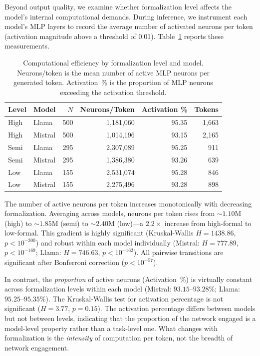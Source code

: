 \documentclass[runningheads]{llncs}
\begin{document}
Beyond output quality, we examine whether formalization level affects the model's internal computational demands. During inference, we instrument each model's MLP layers to record the average number of activated neurons per token (activation magnitude above a threshold of 0.01). Table~\ref{tab:efficiency} reports these measurements.

\begin{table}[h]
\centering
\caption{Computational efficiency by formalization level and model. Neurons/token is the mean number of active MLP neurons per generated token. Activation~\% is the proportion of MLP neurons exceeding the activation threshold.}
\label{tab:efficiency}
\begin{tabular}{llrrrr}
\toprule
Level & Model & $N$ & Neurons/Token & Activation \% & Tokens \\
\midrule
High  & Llama   & 500 & 1{,}181{,}060 & 95.35 & 1{,}663 \\
High  & Mistral & 500 & 1{,}014{,}196 & 93.15 & 2{,}165 \\
Semi  & Llama   & 295 & 2{,}307{,}089 & 95.25 &   911 \\
Semi  & Mistral & 295 & 1{,}386{,}380 & 93.26 &   639 \\
Low   & Llama   & 155 & 2{,}531{,}074 & 95.28 &   846 \\
Low   & Mistral & 155 & 2{,}275{,}496 & 93.28 &   898 \\
\bottomrule
\end{tabular}
\end{table}

The number of active neurons per token increases monotonically with decreasing formalization. Averaging across models, neurons per token rises from ${\sim}1.10\text{M}$ (high) to ${\sim}1.85\text{M}$ (semi) to ${\sim}2.40\text{M}$ (low)---a $2.2\times$ increase from high-formal to low-formal. This gradient is highly significant (Kruskal-Wallis $H = 1438.86$, $p < 10^{-300}$) and robust within each model individually (Mistral: $H = 777.89$, $p < 10^{-169}$; Llama: $H = 746.63$, $p < 10^{-162}$). All pairwise transitions are significant after Bonferroni correction ($p < 10^{-57}$).

In contrast, the \emph{proportion} of active neurons (Activation~\%) is virtually constant across formalization levels within each model (Mistral: $93.15$--$93.28\%$; Llama: $95.25$--$95.35\%$). The Kruskal-Wallis test for activation percentage is not significant ($H = 3.77$, $p = 0.15$). The activation percentage differs between models but not between levels, indicating that the proportion of the network engaged is a model-level property rather than a task-level one. What changes with formalization is the \emph{intensity} of computation per token, not the breadth of network engagement.
\end{document}
